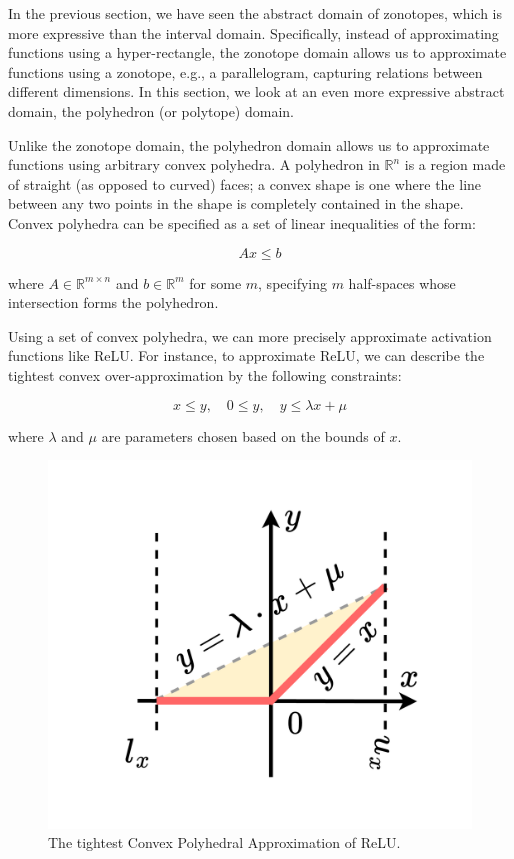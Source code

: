 \documentclass[oneside,11pt,dvipsnames]{book}
\numberwithin{equation}{section}
\theoremstyle{definition}
\theoremstyle{remark}
\begin{document}
In the previous section, we have seen the abstract domain of zonotopes, which is more expressive than the interval domain. Specifically, instead of approximating functions using a hyper-rectangle, the zonotope domain allows us to approximate functions using a zonotope, e.g., a parallelogram, capturing relations between different dimensions. In this section, we look at an even more expressive abstract domain, the polyhedron (or polytope) domain. 

Unlike the zonotope domain, the polyhedron domain allows us to approximate functions using arbitrary convex polyhedra. A polyhedron in \(\mathbb{R}^n\) is a region made of straight (as opposed to curved) faces; a convex shape is one where the line between any two points in the shape is completely contained in the shape. Convex polyhedra can be specified as a set of linear inequalities of the form:

\[
Ax \leq b
\]

where \(A \in \mathbb{R}^{m \times n}\) and \(b \in \mathbb{R}^m\) for some \(m\), specifying \(m\) half-spaces whose intersection forms the polyhedron.

Using a set of convex polyhedra, we can more precisely approximate activation functions like ReLU. For instance, to approximate ReLU, we can describe the tightest convex over-approximation by the following constraints:

\[
x \leq y, \quad 0 \leq y, \quad y \leq \lambda x + \mu
\]

where \(\lambda\) and \(\mu\) are parameters chosen based on the bounds of \(x\).

\begin{figure}[h]
    \centering
    \includegraphics[width=0.5\linewidth]{figure/3-lines-polytope.png}
    \caption{The tightest Convex Polyhedral Approximation of ReLU.}
    \label{fig:enter-label}
\end{figure}
\end{document}
